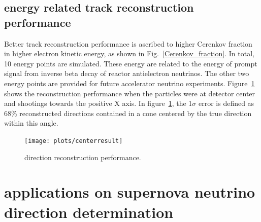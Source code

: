 \documentclass[a4paper,10pt]{cpc-hepnp}
\begin{document}
\subsection{energy related track reconstruction performance}
Better track reconstruction performance is ascribed to higher Cerenkov fraction 
in higher electron kinetic energy, as shown in Fig.~\ref{Cerenkov_fraction}. 
In total, 10 energy points are simulated. These energy are related to the
energy of prompt signal from inverse beta decay of reactor antielectron neutrinos.
The other two  energy points are provided for future accelerator neutrino experiments.
Figure~\ref{rec_performance} shows the
reconstruction performance when the particles were at detector center and
shootings towards the positive X axis. 
In figure~\ref{rec_performance}, the 1$\sigma$ error is defined as 68\% reconstructed
directions contained in a cone centered by the true direction within this angle.
\begin{figure}[htbp]
\centering %
\texttt{[image: plots/centerresult]}
\caption{\label{rec_performance} direction reconstruction performance.}
\end{figure}

\section{applications on supernova neutrino direction determination}
\end{document}
